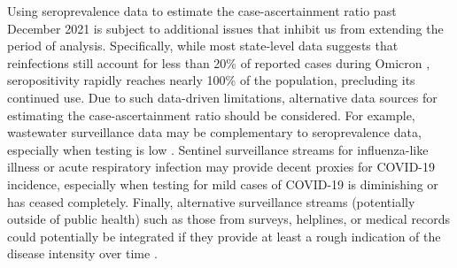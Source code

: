 
Using seroprevalence data to estimate the case-ascertainment ratio past December 2021
is subject to additional issues that inhibit us from extending the period of
analysis. Specifically, while most state-level data suggests that
reinfections still account for less than 20\% of reported cases during Omicron
\citep{ruff2022rapid, nyreinfect2021, hireinfect2022, wareinfect2022},
seropositivity rapidly reaches nearly 100\% of the population, precluding its
continued use. Due to such data-driven limitations, alternative data sources for estimating the
case-ascertainment ratio should be considered. For example, wastewater surveillance data
may be complementary to seroprevalence data, especially when testing is low
\citep{mcmanus2023predicting}. 
Sentinel surveillance streams for influenza-like illness or acute respiratory
infection may provide decent proxies for COVID-19 incidence, especially when
testing for mild cases of COVID-19 is diminishing or has ceased completely.
Finally, alternative surveillance streams (potentially outside of public health)
such as those from surveys, helplines, or medical records could potentially be
integrated if they provide at least a rough indication of the disease intensity
over time \citep{reinhart2021open,ecdc2020strategies}.



